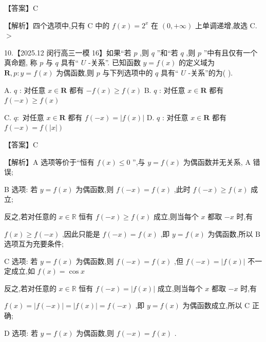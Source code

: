 \documentclass[10pt]{article}
\begin{document}
【答案】C

【解析】四个选项中,只有 \(\mathrm{C}\) 中的 \(f\left( x\right)  = {2}^{x}\) 在 \(\left( {0, + \infty }\right)\) 上单调递增,故选 C. \(>\)

10.【2025.12 闵行高三一模 16】如果“若 \(p\) ,则 \(q\) ”和“若 \(q\) ,则 \(p\) ”中有且仅有一个真命题, 称 \(p\) 与 \(q\) 具有“ \(U\) -关系”. 已知函数 \(y = f\left( x\right)\) 的定义域为 \(\mathbf{R},p : y = f\left( x\right)\) 为偶函数,则 \(p\) 与下列选项中的 \(q\) 具有“ \(U\) -关系”的为( ).

A. \(q\) : 对任意 \(x \in  \mathbf{R}\) 都有 \(- f\left( x\right)  \geq  f\left( x\right)\) B. \(q\) : 对任意 \(x \in  \mathbf{R}\) 都有 \(f\left( {-x}\right)  \geq  f\left( x\right)\)

C. \(q :\) 对任意 \(x \in  \mathbf{R}\) 都有 \(f\left( {-x}\right)  = \left| {f\left( x\right) }\right|\) D. \(q\) : 对任意 \(x \in  \mathbf{R}\) 都有 \(f\left( {-x}\right)  = f\left( \left| x\right| \right)\)

【答案】C

【解析】A 选项等价于“恒有 \(f\left( x\right)  \leq  0\) ”,与 \(y = f\left( x\right)\) 为偶函数并无关系, A 错误;

B 选项: 若 \(y = f\left( x\right)\) 为偶函数,则 \(f\left( {-x}\right)  = f\left( x\right)\) ,此时 \(f\left( {-x}\right)  \geq  f\left( x\right)\) 成立;

反之,若对任意的 \(x \in  \mathbb{R}\) 恒有 \(f\left( {-x}\right)  \geq  f\left( x\right)\) 成立,则当每个 \(x\) 都取 \(- x\) 时,有

\(f\left( x\right)  \geq  f\left( {-x}\right)\) ,因此只能是 \(f\left( {-x}\right)  = f\left( x\right)\) ,即 \(y = f\left( x\right)\) 为偶函数,所以 \(\mathrm{B}\) 选项互为充要条件;

C 选项: 若 \(y = f\left( x\right)\) 为偶函数,则 \(f\left( {-x}\right)  = f\left( x\right)\) ,但 \(f\left( {-x}\right)  = \left| {f\left( x\right) }\right|\) 不一定成立,如 \(f\left( x\right)  = \cos x\)

反之,若对任意的 \(x \in  \mathbb{R}\) 恒有 \(f\left( {-x}\right)  = \left| {f\left( x\right) }\right|\) 成立,则当每个 \(x\) 都取 \(- x\) 时,有

\(f\left( x\right)  = \left| {f\left( {-x}\right) }\right|  = \left| {f\left( x\right) }\right|  = f\left( {-x}\right)\) ,即 \(y = f\left( x\right)\) 为偶函数成立,所以 \(\mathrm{C}\) 正确;

D 选项: 若 \(y = f\left( x\right)\) 为偶函数,则 \(f\left( {-x}\right)  = f\left( x\right)\) .
\end{document}
